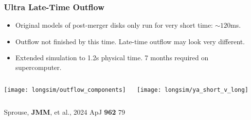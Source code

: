 \documentclass[]{beamer}
\begin{document}
\begin{frame}
  \frametitle{Ultra Late-Time Outflow}
  \begin{itemize}
  \item Original models of post-merger disks only run for very short
    time: $\sim 120$ms.
  \item Outflow not finished by this time. Late-time outflow may look
    very different.
  \item Extended simulation to 1.2s physical time. 7 months required
    on supercomputer.
  \end{itemize}
  \begin{columns}
    \begin{column}{6cm}
      \begin{center}
        \texttt{[image: longsim/outflow\_components]}
      \end{center}
    \end{column}
    \begin{column}{6cm}
      \begin{center}
        \texttt{[image: longsim/ya\_short\_v\_long]}
      \end{center}
    \end{column}
  \end{columns}
  {\footnotesize Sprouse, \textbf{JMM}, et al., 2024 ApJ \textbf{962} 79}
\end{frame}
\end{document}
